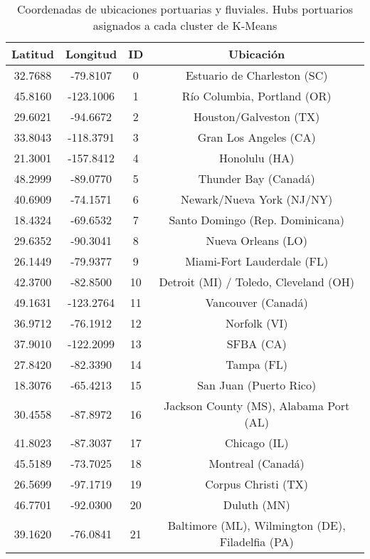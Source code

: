 \documentclass[12pt]{article}
\begin{document}
\begin{table}[H]
	\caption{\label{tabla_hubs} Coordenadas de ubicaciones portuarias y fluviales. Hubs portuarios asignados a cada cluster de K-Means}
	\centering
	\begin{tabular}{|c|c|c|c|}
		\hline
		Latitud & Longitud & ID & Ubicación \\
		\hline
		32.7688 & -79.8107 & 0  & Estuario de Charleston (SC) \\
		\hline
		45.8160 & -123.1006 & 1  & Río Columbia, Portland (OR) \\
		\hline
		29.6021 & -94.6672 & 2  & Houston/Galveston (TX) \\
		\hline
		33.8043 & -118.3791 & 3  & Gran Los Angeles (CA) \\
		\hline
		21.3001 & -157.8412 & 4  & Honolulu (HA) \\
		\hline
		48.2999 & -89.0770 & 5  & Thunder Bay (Canadá) \\
		\hline
		40.6909 & -74.1571 & 6  & Newark/Nueva York (NJ/NY) \\
		\hline
		18.4324 & -69.6532 & 7  & Santo Domingo (Rep. Dominicana) \\
		\hline
		29.6352 & -90.3041 & 8  & Nueva Orleans (LO) \\
		\hline
		26.1449 & -79.9377 & 9  & Miami-Fort Lauderdale (FL) \\
		\hline
		42.3700 & -82.8500 & 10  & Detroit (MI) / Toledo, Cleveland (OH) \\
		\hline
		49.1631 & -123.2764 & 11  & Vancouver (Canadá) \\
		\hline
		36.9712 & -76.1912 & 12  & Norfolk (VI) \\
		\hline
		37.9010 & -122.2099 & 13  & SFBA (CA) \\
		\hline
		27.8420 & -82.3390 & 14  & Tampa (FL) \\
		\hline
		18.3076 & -65.4213 & 15  & San Juan (Puerto Rico) \\
		\hline
		30.4558 & -87.8972 & 16  & Jackson County (MS), Alabama Port (AL) \\
		\hline
		41.8023 & -87.3037 & 17  & Chicago (IL) \\
		\hline
		45.5189 & -73.7025 & 18  & Montreal (Canadá) \\
		\hline
		26.5699 & -97.1719 & 19  & Corpus Christi (TX) \\
		\hline
		46.7701 & -92.0300 & 20  & Duluth (MN) \\
		\hline
		39.1620 & -76.0841 & 21  & Baltimore (ML), Wilmington (DE), Filadelfia (PA) \\

\end{tabular}
\end{table}
\end{document}
